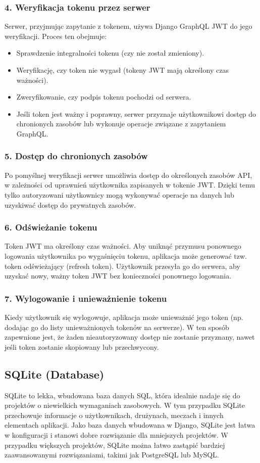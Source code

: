 \documentclass[wmii,inf,inz]{uwmthesis} %
\newenvironment{indenteditemize}
{\begin{itemize}[left=1cm]} %
{\end{itemize}}
\begin{document}
\subsubsection{4. Weryfikacja tokenu przez serwer}
Serwer, przyjmując zapytanie z tokenem, używa Django GraphQL JWT do jego weryfikacji. Proces ten obejmuje:
\begin{indenteditemize}
    \item Sprawdzenie integralności tokenu (czy nie został zmieniony).
    \item Weryfikację, czy token nie wygasł (tokeny JWT mają określony czas ważności).
    \item Zweryfikowanie, czy podpis tokenu pochodzi od serwera.
    \item Jeśli token jest ważny i poprawny, serwer przyznaje użytkownikowi dostęp do chronionych zasobów lub wykonuje operacje związane z zapytaniem GraphQL.
\end{indenteditemize}
\subsubsection{5. Dostęp do chronionych zasobów}
Po pomyślnej weryfikacji serwer umożliwia dostęp do określonych zasobów API, w zależności od uprawnień użytkownika zapisanych w tokenie JWT. Dzięki temu tylko autoryzowani użytkownicy mogą wykonywać operacje na danych lub uzyskiwać dostęp do prywatnych zasobów.
\subsubsection{6. Odświeżanie tokenu}
Token JWT ma określony czas ważności. Aby uniknąć przymusu ponownego logowania użytkownika po wygaśnięciu tokenu, aplikacja może generować tzw. token odświeżający (refresh token). Użytkownik przesyła go do serwera, aby uzyskać nowy, ważny token JWT bez konieczności ponownego logowania.
\subsubsection{7. Wylogowanie i unieważnienie tokenu}
Kiedy użytkownik się wylogowuje, aplikacja może unieważnić jego token (np. dodając go do listy unieważnionych tokenów na serwerze). W ten sposób zapewnione jest, że żaden nieautoryzowany dostęp nie zostanie przyznany, nawet jeśli token zostanie skopiowany lub przechwycony.
\subsection{SQLite (Database)}
SQLite to lekka, wbudowana baza danych SQL, która idealnie nadaje się do projektów o niewielkich wymaganiach zasobowych. W tym przypadku SQLite przechowuje informacje o użytkownikach, drużynach, meczach i innych elementach aplikacji. Jako baza danych wbudowana w Django, SQLite jest łatwa w konfiguracji i stanowi dobre rozwiązanie dla mniejszych projektów. W przypadku większych projektów, SQLite można łatwo zastąpić bardziej zaawansowanymi rozwiązaniami, takimi jak PostgreSQL lub MySQL.
\end{document}
